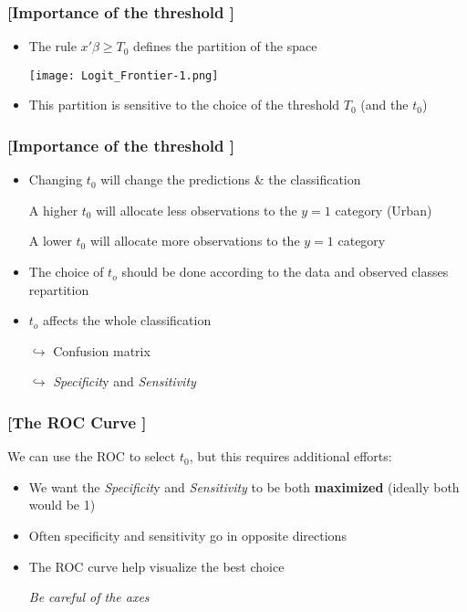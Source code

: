 \documentclass[xcolor=x11names,compress]{beamer}
\renewcommand{\(}{\begin{columns}}
\renewcommand{\)}{\end{columns}}
\newcommand{\<}[1]{\begin{column}{#1}}
\renewcommand{\>}{\end{column}}
\begin{document}
\begin{frame} %
\frametitle{\textcolor{brique}{[Importance of the threshold ]}}
\pause
 \begin{itemize}[<+->]
  \item The rule $ x'\beta \geq T_0$ defines the partition of the space
  \item[] \begin{center}\texttt{[image: Logit\_Frontier-1.png]} \end{center}
  \item This partition is sensitive to the choice of the threshold $T_0$ (and the $t_0$)
\end{itemize}
\end{frame}

\begin{frame} %
\frametitle{\textcolor{brique}{[Importance of the threshold ]}}
\pause
 \begin{itemize}[<+->]
  \item Changing $t_0$ will  change the predictions \&  the classification
  \item[] A higher $t_0$ will allocate less observations to the $y=1$ category (Urban)
  \item[] A lower $t_0$ will allocate more observations to the $y=1$ category
  \item The choice of $t_o$ should be done according to the data and observed classes repartition
  \item $t_o$ affects the whole classification
  \item[$\hookrightarrow$] Confusion matrix
  \item[$\hookrightarrow$] \textit{Specificit}y and \textit{Sensitivity} 
\end{itemize}
\end{frame}

\begin{frame} %
\frametitle{\textcolor{brique}{[The ROC Curve ]}}
We can use the ROC to select $t_0$, but this requires additional efforts:
\pause
 \begin{itemize}[<+->]
  \item We want the \textit{Specificit}y and \textit{Sensitivity} to be both \textbf{maximized} (ideally both would be 1)
  \item Often specificity and sensitivity go in opposite directions
  \item The ROC curve help visualize the best choice 
  \item[] \textit{Be careful of the axes }
\end{itemize}
\end{frame}
\end{document}
